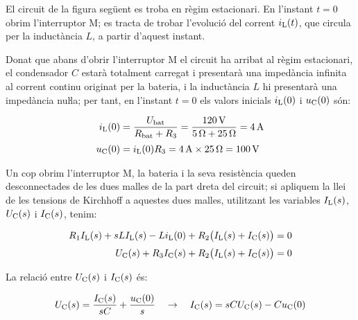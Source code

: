 \begin{exemple}
    El circuit de la figura següent es troba en règim estacionari. En
    l'instant $t=0$ obrim l'interruptor M; es tracta de trobar
    l'evolució del corrent $i_\mathrm{L}(t)$, que circula per la inductància
    $L$, a partir d'aquest instant.

    \begin{center}
        
    \end{center}

     Donat que abans d'obrir l'interruptor M el circuit ha arribat al
     règim estacionari, el condensador $C$ estarà totalment carregat  i
     presentarà una impedància infinita al corrent continu originat per la
     bateria, i la inductància $L$ hi presentarà una impedància nuŀla;
     per tant, en l'instant $t=0$ els valors inicials $i_\mathrm{L}(0)$ i
     $u_\mathrm{C}(0)$ són:

     \begin{align*}
        i_\mathrm{L}(0) &= \frac{U_\mathrm{bat}}{R_\mathrm{bat} + R_3} = \frac{\SI{120}{V}}
        {\SI{5}{\ohm} + \SI{25}{\ohm}} = \SI{4}{A} \\[0.5ex]
        u_\mathrm{C}(0) &= i_\mathrm{L}(0) R_3 = \SI{4}{A}\times \SI{25}{\ohm} = \SI{100}{V}
     \end{align*}

    Un cop obrim l'interruptor M, la bateria i la seva resistència
    queden desconnectades de les dues malles de la part dreta del circuit; si apliquem la llei de les tensions de Kirchhoff  a aquestes
    dues malles, utilitzant les variables $I_\mathrm{L}(s)$, $U_\mathrm{C}(s)$ i
    $I_\mathrm{C}(s)$, tenim:

    \begin{align*}
        R_1 I_\mathrm{L}(s) + s L I_\mathrm{L}(s) - L i_\mathrm{L}(0) + R_2
        \bigl(I_\mathrm{L}(s) + I_\mathrm{C}(s)\bigr) &=0 \\[0.5ex]
        U_\mathrm{C}(s) + R_3 I_\mathrm{C}(s) + R_2 \bigl(I_\mathrm{L}(s) + I_\mathrm{C}(s)\bigr) &=0
    \end{align*}

    La relació entre $U_\mathrm{C}(s)$ i $I_\mathrm{C}(s)$ és:

    \begin{equation*}
        U_\mathrm{C}(s) = \frac{I_\mathrm{C}(s)}{s C} + \frac{u_\mathrm{C}(0)}{s}
        \quad\rightarrow\quad I_\mathrm{C}(s) = s C U_\mathrm{C}(s) - C u_\mathrm{C}(0)
    \end{equation*}


\end{exemple}
